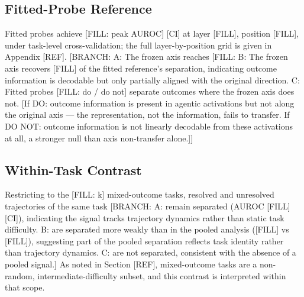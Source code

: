 \documentclass{article}
\begin{document}
\subsection{Fitted-Probe Reference}

Fitted probes achieve [FILL: peak AUROC] [CI] at layer [FILL], position [FILL], under task-level cross-validation; the full layer-by-position grid is given in Appendix [REF]. [BRANCH:
A: The frozen axis reaches [FILL: %
B: The frozen axis recovers [FILL] of the fitted reference's separation, indicating outcome information is decodable but only partially aligned with the original direction.
C: Fitted probes [FILL: do / do not] separate outcomes where the frozen axis does not. [If DO: outcome information is present in agentic activations but not along the original axis — the representation, not the information, fails to transfer. If DO NOT: outcome information is not linearly decodable from these activations at all, a stronger null than axis non-transfer alone.]]


\subsection{Within-Task Contrast}

Restricting to the [FILL: k] mixed-outcome tasks, resolved and unresolved trajectories of the same task [BRANCH:
A: remain separated (AUROC [FILL] [CI]), indicating the signal tracks trajectory dynamics rather than static task difficulty.
B: are separated more weakly than in the pooled analysis ([FILL] vs [FILL]), suggesting part of the pooled separation reflects task identity rather than trajectory dynamics.
C: are not separated, consistent with the absence of a pooled signal.]
As noted in Section [REF], mixed-outcome tasks are a non-random, intermediate-difficulty subset, and this contrast is interpreted within that scope.

\end{document}
